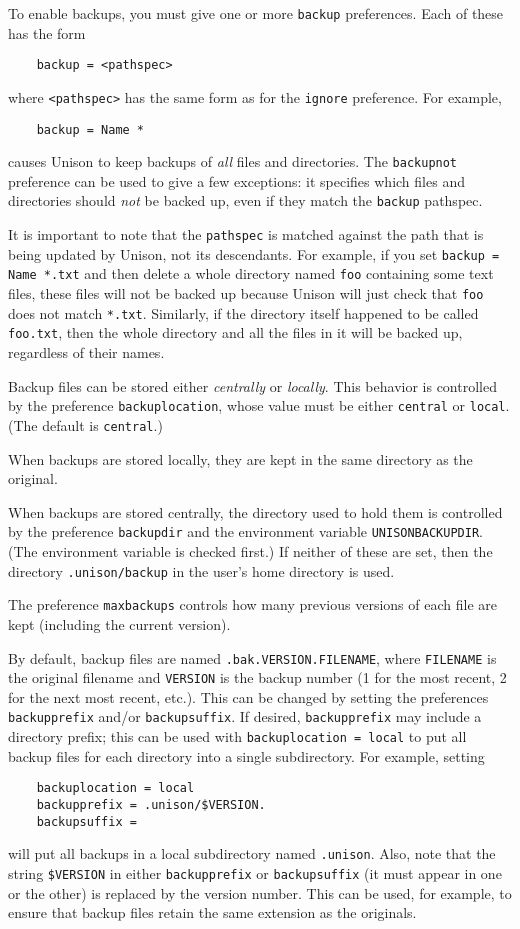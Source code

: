\documentclass{article}
\begin{document}
To enable backups, you must give one or more \verb|backup| preferences.
Each of these has the form
\begin{verbatim}
    backup = <pathspec>
\end{verbatim}
where \verb|<pathspec>| has the same form as for the \verb|ignore|
preference.  For example, 
\begin{verbatim}
    backup = Name *
\end{verbatim}
causes Unison to keep backups of {\em all} files and directories.  The
\verb|backupnot| preference can be used to give a few exceptions: it
specifies which files and directories should {\em not} be backed up, even if
they match the \verb|backup| pathspec. 

It is important to note that the \verb|pathspec| is matched against the path
that is being updated by Unison, not its descendants.  For example, if you
set \verb|backup = Name *.txt| and then delete a whole directory named
\verb|foo| containing some text files, these files will not be backed up
because Unison will just check that \verb|foo| does not match \verb|*.txt|.
Similarly, if the directory itself happened to be called \verb|foo.txt|,
then the whole directory and all the files in it will be backed up,
regardless of their names. 

Backup files can be stored either {\em centrally} or {\em locally}.  This
behavior is controlled by the preference \verb|backuplocation|, whose value
must be either \verb|central| or \verb|local|.  (The default is
\verb|central|.)  

When backups are stored locally, they are kept in the same
directory as the original.

When backups are stored centrally, the directory used to hold them is
controlled by the preference \verb|backupdir| and the
environment variable \verb|UNISONBACKUPDIR|.  (The environment variable is
checked first.)  If neither of these are set, then the directory
\verb|.unison/backup| in the user's home directory is used.

The preference \verb|maxbackups| controls how many previous versions of
each file are kept (including the current version).  

By default, backup files are named \verb|.bak.VERSION.FILENAME|,
where \verb|FILENAME| is the original filename and \verb|VERSION| is the
backup number (1 for the most recent, 2 for the next most recent,
etc.).  This can be changed by setting the preferences \verb|backupprefix|
and/or \verb|backupsuffix|.  If desired, \verb|backupprefix| may include a
directory prefix; this can be used with \verb|backuplocation = local| to put all
backup files for each directory into a single subdirectory.  For example, setting
\begin{verbatim}
    backuplocation = local
    backupprefix = .unison/$VERSION.
    backupsuffix = 
\end{verbatim}
will put all backups in a local subdirectory named \verb|.unison|.  Also,
note that the string \verb|$VERSION| in either \verb|backupprefix| or
\verb|backupsuffix| (it must appear in one or the other) is replaced by
the version number.  This can be used, for example, to ensure that backup
files retain the same extension as the originals.
\end{document}
